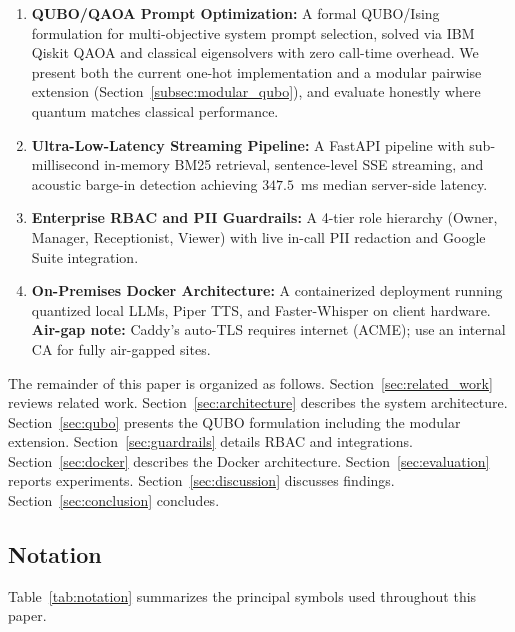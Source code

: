 \documentclass[11pt,a4paper]{article}
\begin{document}
\begin{enumerate}[leftmargin=*]
    \item \textbf{QUBO/QAOA Prompt Optimization:} A formal QUBO/Ising formulation for multi-objective system prompt selection, solved via IBM Qiskit QAOA and classical eigensolvers with zero call-time overhead. We present both the current one-hot implementation and a modular pairwise extension (Section~\ref{subsec:modular_qubo}), and evaluate honestly where quantum matches classical performance.
    \item \textbf{Ultra-Low-Latency Streaming Pipeline:} A FastAPI pipeline with sub-millisecond in-memory BM25 retrieval, sentence-level SSE streaming, and acoustic barge-in detection achieving $347.5$~ms median server-side latency.
    \item \textbf{Enterprise RBAC and PII Guardrails:} A 4-tier role hierarchy (Owner, Manager, Receptionist, Viewer) with live in-call PII redaction and Google Suite integration.
    \item \textbf{On-Premises Docker Architecture:} A containerized deployment running quantized local LLMs, Piper TTS, and Faster-Whisper on client hardware. \textbf{Air-gap note:} Caddy's auto-TLS requires internet (ACME); use an internal CA for fully air-gapped sites.
\end{enumerate}

The remainder of this paper is organized as follows. Section~\ref{sec:related_work} reviews related work. Section~\ref{sec:architecture} describes the system architecture. Section~\ref{sec:qubo} presents the QUBO formulation including the modular extension. Section~\ref{sec:guardrails} details RBAC and integrations. Section~\ref{sec:docker} describes the Docker architecture. Section~\ref{sec:evaluation} reports experiments. Section~\ref{sec:discussion} discusses findings. Section~\ref{sec:conclusion} concludes.

\subsection{Notation}
\label{subsec:notation}

Table~\ref{tab:notation} summarizes the principal symbols used throughout this paper.
\end{document}
